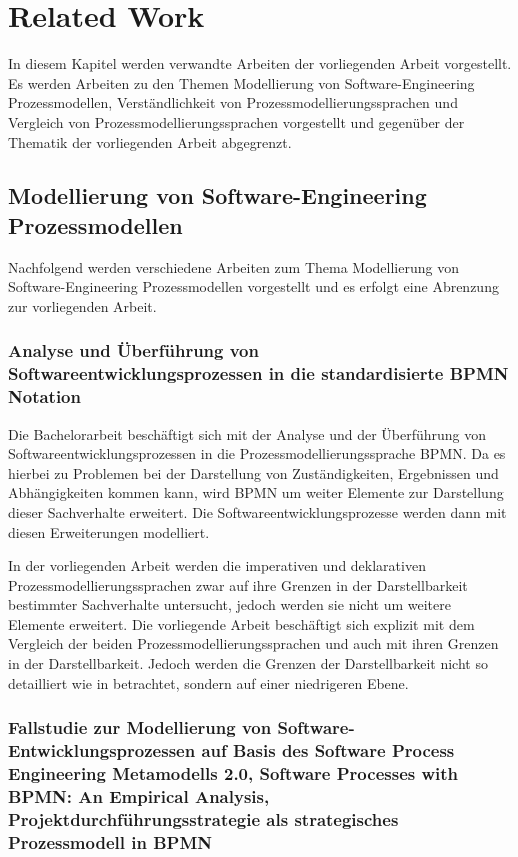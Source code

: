 \chapter{Related Work}\label{sec:chapter9}

In diesem Kapitel werden verwandte Arbeiten der vorliegenden Arbeit vorgestellt. Es werden Arbeiten zu den Themen Modellierung von Software-Engineering Prozessmodellen, Verständlichkeit von Prozessmodellierungssprachen und Vergleich von Prozessmodellierungssprachen vorgestellt und gegenüber der Thematik der vorliegenden Arbeit abgegrenzt.

\section{Modellierung von Software-Engineering Prozessmodellen}

Nachfolgend werden verschiedene Arbeiten zum Thema Modellierung von Software-Engineering Prozessmodellen vorgestellt und es erfolgt eine Abrenzung zur vorliegenden Arbeit.\newline

\subsection {Analyse und Überführung von Softwareentwicklungsprozessen in die standardisierte BPMN Notation}
Die Bachelorarbeit \cite{Menhorn2014} beschäftigt sich mit der Analyse und der Überführung von Softwareentwicklungsprozessen in die Prozessmodellierungssprache BPMN. Da es hierbei zu Problemen bei der Darstellung von Zuständigkeiten, Ergebnissen und Abhängigkeiten kommen kann, wird BPMN um weiter Elemente zur Darstellung dieser Sachverhalte erweitert. Die Softwareentwicklungsprozesse werden dann mit diesen Erweiterungen modelliert.\newline

In der vorliegenden Arbeit werden die imperativen und deklarativen Prozessmodellierungssprachen zwar auf ihre Grenzen in der Darstellbarkeit bestimmter Sachverhalte untersucht, jedoch werden sie nicht um weitere Elemente erweitert. Die vorliegende Arbeit beschäftigt sich explizit mit dem Vergleich der beiden Prozessmodellierungssprachen und auch mit ihren Grenzen in der Darstellbarkeit. Jedoch werden die Grenzen der Darstellbarkeit nicht so detailliert wie in \cite{Menhorn2014} betrachtet, sondern auf einer niedrigeren Ebene. \newline


\subsection{Fallstudie zur Modellierung von Software-Entwicklungsprozessen auf Basis des Software Process Engineering Metamodells 2.0, Software Processes with BPMN: An Empirical Analysis, Projektdurchführungsstrategie als strategisches Prozessmodell in BPMN}


